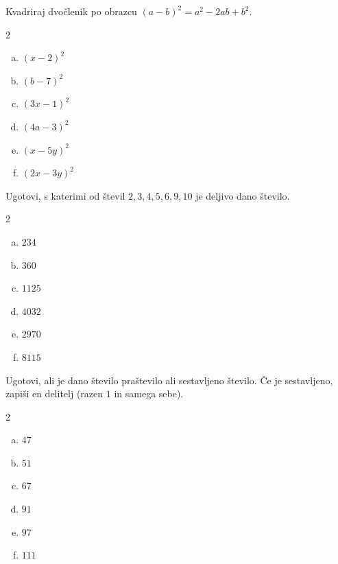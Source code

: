 \documentclass[a4paper,12pt]{letter}
\begin{document}
\begin{naloga}
Kvadriraj dvo\v{c}lenik po obrazcu $(a-b)^2=a^2-2ab+b^2$.

\begin{multicols}{2}
\begin{enumerate}[a.)]
\item $(x-2)^2$
\item $(b-7)^2$
\item $(3x-1)^2$
\item $(4a-3)^2$
\item $(x-5y)^2$
\item $(2x-3y)^2$
\end{enumerate}
\end{multicols}
\end{naloga}

\newpage

\begin{naloga}
Ugotovi, s katerimi od \v{s}tevil $2, 3, 4, 5, 6, 9, 10$ je deljivo dano \v{s}tevilo.

\begin{multicols}{2}
\begin{enumerate}[a.)]
\item $234$
\item $360$
\item $1125$
\item $4032$
\item $2970$
\item $8115$
\end{enumerate}
\end{multicols}
\end{naloga}

\begin{naloga}
Ugotovi, ali je dano \v{s}tevilo pra\v{s}tevilo ali sestavljeno \v{s}tevilo.
\v{C}e je sestavljeno, zapi\v{s}i en delitelj (razen $1$ in samega sebe).

\begin{multicols}{2}
\begin{enumerate}[a.)]
\item $47$
\item $51$
\item $67$
\item $91$
\item $97$
\item $111$
\end{enumerate}
\end{multicols}
\end{naloga}
\end{document}
